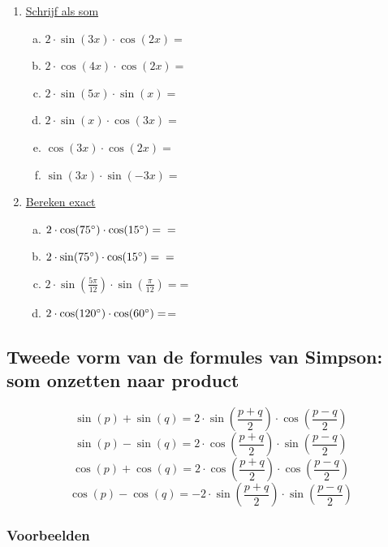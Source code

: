 \documentclass[a4paper,12pt]{article}
\begin{document}
\begin{enumerate}[(1)]
  \item\underline{Schrijf als som}
    \begin{enumerate}[(a)]
      \item $2\cdot \sin(3x)\cdot \cos(2x)= $\dotfill
      \item $2\cdot \cos(4x)\cdot \cos(2x)= $\dotfill
      \item $2\cdot \sin(5x)\cdot \sin(x)= $\dotfill
      \item $2\cdot \sin(x)\cdot \cos(3x)= $\dotfill
      \item $\cos(3x)\cdot \cos(2x)= $\dotfill
      \item $\sin(3x)\cdot \sin(-3x)= $\dotfill
    \end{enumerate}
  \item \underline{Bereken exact}
    \begin{enumerate}[(a)]
      \item $2\cdot \cos(75\degree)\cdot \cos(15\degree) = \dotfill \newline =$\dotfill
      \item $2\cdot \sin(75\degree)\cdot \cos(15\degree) = \dotfill \newline =$\dotfill
      \item $2\cdot \sin(\frac{5\pi}{12})\cdot \sin(\frac{\pi}{12}) = $\dotfill \newline =\dotfill
      \item $2\cdot \cos(120^\circ)\cdot \cos(60^\circ) = $\dotfill \newline =\dotfill
    \end{enumerate}
\end{enumerate}

\newpage
\subsection{Tweede vorm van de formules van Simpson: som onzetten naar product}
\[\sin(p)+\sin(q)=2\cdot \sin(\frac{p+q}{2})\cdot \cos(\frac{p-q}{2})
\]
\[\sin(p)-\sin(q)=2\cdot \cos(\frac{p+q}{2})\cdot \sin(\frac{p-q}{2})
\]
\[\cos(p)+\cos(q)=2\cdot \cos(\frac{p+q}{2})\cdot \cos(\frac{p-q}{2})
\]
\[\cos(p)-\cos(q)=-2\cdot \sin(\frac{p+q}{2})\cdot \sin(\frac{p-q}{2})
\]

\subsubsection*{Voorbeelden}
\end{document}
